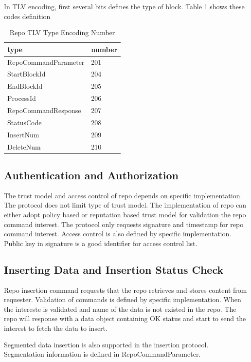 \documentclass{acm_proc_article-sp}
\begin{document}
In TLV encoding, first several bits defines the type of block. Table 1 shows these codes definition

\begin{table}[!hbp]
\centering

\begin{tabular}{l l}

\hline
type & number \\
\hline
RepoCommandParameter & 201 \\
StartBlockId & 204 \\
EndBlockId & 205 \\
ProcessId & 206 \\
RepoCommandResponse & 207\\
StatusCode & 208 \\
InsertNum & 209 \\
DeleteNum & 210 \\
\hline

\end{tabular}
\caption{Repo TLV Type Encoding Number}
\end{table}



\subsection{Authentication and Authorization}
The trust model and access control of repo depends on specific implementation. The protocol does not limit type of trust model. The implementation of repo can either adopt policy based or reputation based trust model for validation the repo command interest. The protocol only requests signature and timestamp for repo command interest. Access control is also defined by specific implementation. Public key in signature is a good identifier for access control list.

\subsection{Inserting Data and Insertion Status Check}

Repo insertion command requests that the repo retrieves and stores content from requester. Validation of commands is defined by specific implementation. When the intereste is validated and name of the data is not existed in the repo. The repo will response with a data object containing OK status and start to send the interest to fetch the data to insert.

Segmented data insertion is also supported in the insertion protocol. Segmentation information is defined in RepoCommandParameter.
\end{document}
